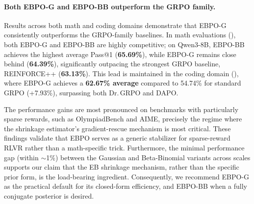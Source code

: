 \documentclass{article}
\theoremstyle{plain}
\theoremstyle{definition}
\theoremstyle{remark}
\newcommand{\ours}{\textsc{EBPO}\xspace}
\newcommand{\oursG}{\textsc{EBPO-G}\xspace}
\newcommand{\oursBB}{\textsc{EBPO-BB}\xspace}
\begin{document}
\paragraph{Both \oursG and \oursBB outperform the GRPO family.}
Results across both math and coding domains demonstrate that \oursG consistently outperforms the GRPO-family baselines. In math evaluations (), both \oursG and \oursBB are highly competitive; on Qwen3-8B, \oursBB achieves the highest average Pass@1 (\textbf{65.69\%}), while \oursG remains close behind (\textbf{64.39\%}), significantly outpacing the strongest GRPO baseline, REINFORCE++ (\textbf{63.13\%}). This lead is maintained in the coding domain (), where \oursG achieves a \textbf{62.67\% average} compared to 54.74\% for standard GRPO (+7.93\%), surpassing both Dr.\,GRPO and DAPO. 

The performance gains are most pronounced on benchmarks with particularly sparse rewards, such as OlympiadBench and AIME, precisely the regime where the shrinkage estimator's gradient-rescue mechanism is most critical. These findings validate that \ours serves as a generic stabilizer for sparse-reward RLVR rather than a math-specific trick. Furthermore, the minimal performance gap (within $\sim$1\%) between the Gaussian and Beta-Binomial variants across scales supports our claim that the EB shrinkage mechanism, rather than the specific prior form, is the load-bearing ingredient. Consequently, we recommend \oursG as the practical default for its closed-form efficiency, and \oursBB when a fully conjugate posterior is desired.

\end{document}
